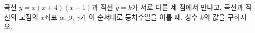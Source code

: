 곡선 $y=x(x+4)(x-1)$과 직선 $y=k$가 서로 다른 세 점에서 만나고, 곡선과 직선의 교점의 $x$좌표 $\alpha$, $\beta$, $\gamma$가 이 순서대로 등차수열을 이룰 때, 상수 $k$의 값을 구하시오. \cond{$\alpha<\beta<\gamma$}
